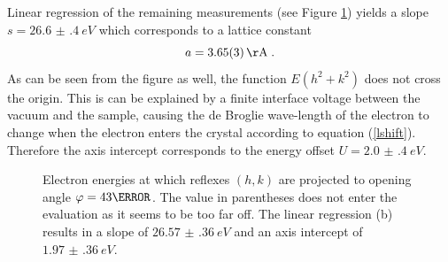 \documentclass[a4paper]{scrartcl}
\numberwithin{equation}{section}
\numberwithin{figure}{section}
\numberwithin{table}{section}
\newcommand{\eq}[2]{\begin{equation}#1\label{#2}\end{equation}}
\newcommand{\Formel}[1]{(\ref{#1})}
\begin{document}
Linear regression of the remaining measurements (see Figure \ref{fig:rr}) yields a slope $s=\SI{26.6(4)}{eV}$ which corresponds to a lattice constant 
\eq{a=\SI{3.65(3)}{\AA}\;.}{a1}
As can be seen from the figure as well, the function $E(h^2+k^2)$ does not cross the origin. This is can be explained by a finite interface voltage between the vacuum and the sample, causing the de Broglie wave-length of the electron to change when the electron enters the crystal according to equation \Formel{lshift}. Therefore the axis intercept corresponds to the energy offset $U=\SI{2.0(4)}{eV}$.

 \begin{figure} 
 \centering
{}
\hfill
{}

\caption{\small Electron energies at which reflexes $(h,k)$ are projected to opening angle $\varphi=43 \degree$. The value in parentheses does not enter the evaluation as it seems to be too far off. The linear regression (b) results in a slope of $\SI{26.57(36)}{eV}$ and an axis intercept of $\SI{1.97(36)}{eV}$.}
	\label{fig:rr}
\end{figure}
\end{document}
